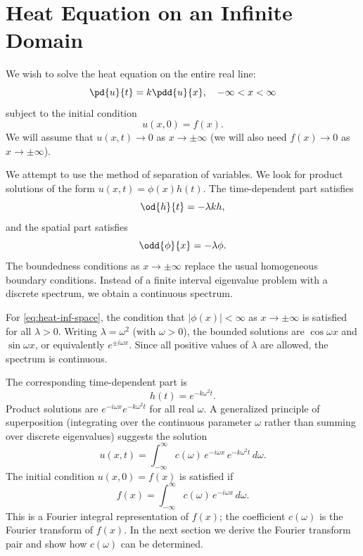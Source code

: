 \section{Heat Equation on an Infinite Domain}
\label{sec:heat-infinite}

We wish to solve the heat equation on the entire real line:
\begin{equation}
\label{eq:heat-inf-pde}
\pd{u}{t} = k\pdd{u}{x}, \quad -\infty < x < \infty
\end{equation}
subject to the initial condition
\begin{equation}
\label{eq:heat-inf-ic}
u(x,0) = f(x).
\end{equation}
We will assume that $u(x,t) \to 0$ as $x \to \pm\infty$ (we will also need $f(x) \to 0$ as $x \to \pm\infty$).

We attempt to use the method of separation of variables.  We look for product solutions of the form $u(x,t) = \phi(x)h(t)$.  The time-dependent part satisfies
\begin{equation}
\label{eq:heat-inf-time}
\od{h}{t} = -\lambda k h,
\end{equation}
and the spatial part satisfies
\begin{equation}
\label{eq:heat-inf-space}
\odd{\phi}{x} = -\lambda\phi.
\end{equation}
The boundedness conditions as $x \to \pm\infty$ replace the usual homogeneous boundary conditions.  Instead of a finite interval eigenvalue problem with a discrete spectrum, we obtain a continuous spectrum.

For \eqref{eq:heat-inf-space}, the condition that $|\phi(x)| < \infty$ as $x \to \pm\infty$ is satisfied for all $\lambda > 0$.  Writing $\lambda = \omega^2$ (with $\omega > 0$), the bounded solutions are $\cos\omega x$ and $\sin\omega x$, or equivalently $e^{\pm i\omega x}$.  Since all positive values of $\lambda$ are allowed, the spectrum is continuous.

The corresponding time-dependent part is
\[
h(t) = e^{-k\omega^2 t}.
\]
Product solutions are $e^{-i\omega x}e^{-k\omega^2 t}$ for all real $\omega$.  A generalized principle of superposition (integrating over the continuous parameter $\omega$ rather than summing over discrete eigenvalues) suggests the solution
\begin{equation}
\label{eq:heat-inf-superposition}
u(x,t) = \int_{-\infty}^{\infty} c(\omega)\,e^{-i\omega x}\,e^{-k\omega^2 t}\,d\omega.
\end{equation}
The initial condition $u(x,0) = f(x)$ is satisfied if
\begin{equation}
\label{eq:heat-inf-ic-integral}
f(x) = \int_{-\infty}^{\infty} c(\omega)\,e^{-i\omega x}\,d\omega.
\end{equation}
This is a Fourier integral representation of $f(x)$; the coefficient $c(\omega)$ is the Fourier transform of $f(x)$.  In the next section we derive the Fourier transform pair and show how $c(\omega)$ can be determined.
